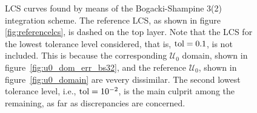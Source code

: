 \begin{figure}[htpb]
    \centering
    
    \caption[LCS curves found by means of the Bogacki-Shampine 3(2) integration
    scheme]{
        LCS curves found by means of the Bogacki-Shampine 3(2) integration
        scheme. The reference LCS, as shown in figure
        \ref{fig:referencelcs}, is dashed on the top layer. Note that
        the LCS for the lowest tolerance level considered, that is,
        $\textnormal{tol}=0.1$,
        is not included. This is because the corresponding $\mathcal{U}_{0}$
        domain, shown in figure~\ref{fig:u0_dom_err_bs32}, and the reference
        $\mathcal{U}_{0}$, shown in figure~\ref{fig:u0_domain} are vevery
        dissimilar. The second lowest tolerance level, i.e., $\textnormal{tol}=10^{-2}$,
        is the main culprit among the remaining, as far as discrepancies are
    concerned.}
    \label{fig:lcs_rkbs32}
\end{figure}
